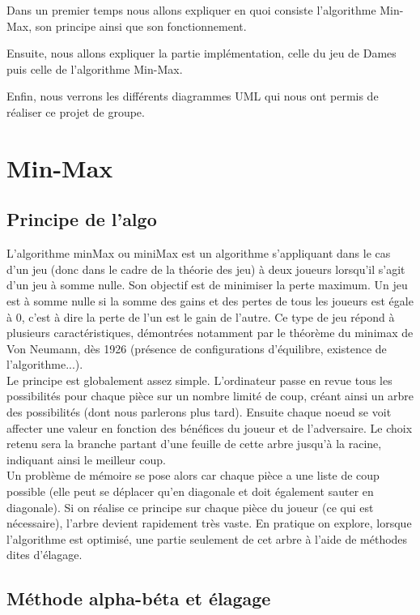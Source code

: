 \documentclass[12,french]{report}
\begin{document}
Dans un premier temps nous allons expliquer en quoi consiste l'algorithme Min-Max, son principe ainsi que son fonctionnement.


Ensuite, nous allons expliquer la partie implémentation, celle du jeu de Dames puis celle de l'algorithme Min-Max.


Enfin, nous verrons les différents diagrammes UML qui nous ont permis de réaliser ce projet de groupe.


\chapter{Min-Max}

\section{Principe de l'algo}

L'algorithme minMax ou miniMax est un algorithme s'appliquant dans le cas d'un jeu (donc dans le cadre de la théorie des jeu) à deux joueurs lorsqu'il s'agit d'un jeu à somme nulle. Son objectif est de minimiser la perte maximum. Un jeu est à somme nulle si la somme des gains et des pertes de tous les joueurs est égale à 0, c'est à dire la perte de l'un est le gain de l'autre. Ce type de jeu répond à plusieurs caractéristiques, démontrées notamment par le théorème du minimax de Von Neumann, dès 1926 (présence de configurations d'équilibre, existence de l'algorithme...).\\

Le principe est globalement assez simple. L'ordinateur passe en revue
tous les possibilités pour chaque pièce sur un nombre limité de coup,
créant ainsi un arbre des possibilités (dont nous parlerons plus tard). Ensuite chaque noeud se voit
affecter une valeur en fonction des bénéfices du joueur et de l'adversaire.
Le choix retenu sera la branche partant d'une feuille de cette arbre
jusqu'à la racine, indiquant ainsi le meilleur coup. \\

Un problème de mémoire se pose alors car chaque pièce a une liste de coup possible (elle peut se déplacer qu'en diagonale et doit également sauter en diagonale). Si on réalise ce principe sur chaque pièce du joueur (ce qui est nécessaire), l'arbre devient rapidement très vaste. En pratique on explore, lorsque l'algorithme est optimisé,
une partie seulement de cet arbre à l'aide de méthodes dites d'élagage.

\section{Méthode alpha-béta et élagage}
\end{document}
